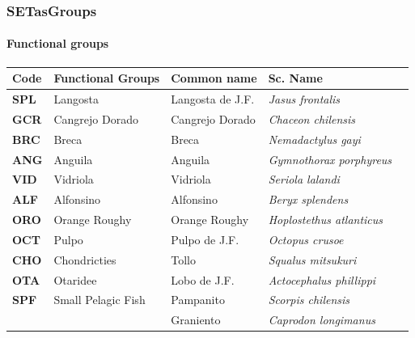 \documentclass[11pt]{article}
\begin{document}
\subsubsection*{SETasGroups}
\label{sec-5-1-2}
\paragraph*{Functional groups}
\label{sec-5-1-2-1}


\begin{center}
\begin{tabular}{lllll}
 Code          &  Functional Groups   &  Common name        &  Sc. Name                                    &     \\
\hline
 \textbf{SPL}  &  Langosta            &  Langosta de J.F.   &  \emph{Jasus frontalis}                      &     \\
\hline
 \textbf{GCR}  &  Cangrejo Dorado     &  Cangrejo Dorado    &  \emph{Chaceon chilensis}                    &     \\
\hline
 \textbf{BRC}  &  Breca               &  Breca              &  \emph{Nemadactylus gayi}                    &     \\
\hline
 \textbf{ANG}  &  Anguila             &  Anguila            &  \emph{Gymnothorax porphyreus}               &     \\
\hline
 \textbf{VID}  &  Vidriola            &  Vidriola           &  \emph{Seriola lalandi}                      &     \\
\hline
 \textbf{ALF}  &  Alfonsino           &  Alfonsino          &  \emph{Beryx splendens}                      &     \\
\hline
 \textbf{ORO}  &  Orange Roughy       &  Orange Roughy      &  \emph{Hoplostethus atlanticus}              &     \\
\hline
 \textbf{OCT}  &  Pulpo               &  Pulpo de  J.F.     &  \emph{Octopus crusoe}                       &     \\
\hline
 \textbf{CHO}  &  Chondricties        &  Tollo              &  \emph{Squalus mitsukuri}                    &     \\
\hline
 \textbf{OTA}  &  Otaridee            &  Lobo de J.F.       &  \emph{Actocephalus phillippi}               &     \\
\hline
 \textbf{SPF}  &  Small Pelagic Fish  &  Pampanito          &  \emph{Scorpis chilensis}                    &     \\
               &                      &  Graniento          &  \emph{Caprodon longimanus}                  &     \\

\end{tabular}
\end{center}
\end{document}
